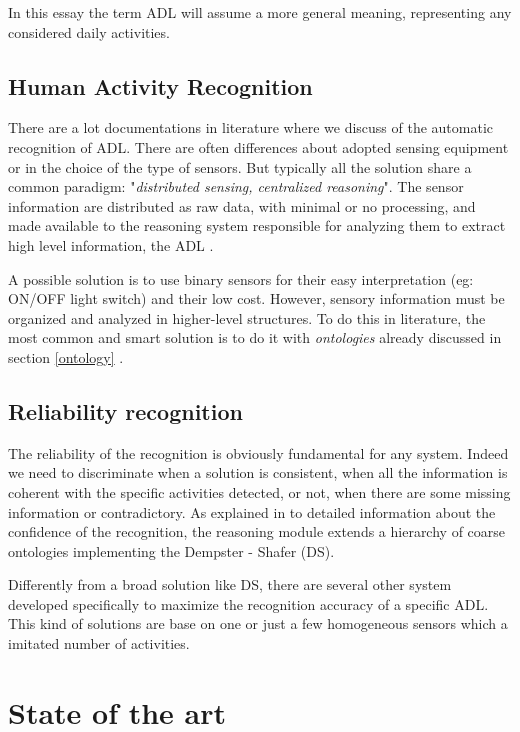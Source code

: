 \documentclass{thesisreport}
\begin{document}
In this essay the term ADL will assume a more general meaning, representing any  considered daily activities. 

\section{Human Activity Recognition}
There are a lot documentations in literature where we discuss of the automatic recognition of ADL. There are often differences about adopted sensing equipment or in the choice of the type of sensors. But typically all the solution share a common paradigm: "\textit{distributed sensing, centralized reasoning}". The sensor information are distributed as raw data, with minimal or no processing, and made available to the reasoning system responsible for analyzing them to extract high level information, the ADL \cite{buoncompagni2017towards}.   

A possible solution is to use binary sensors for their easy interpretation (eg: ON/OFF light switch) and their low cost. However, sensory information must be organized and analyzed in higher-level structures. To do this in literature, the most common and smart solution is to do it with \textit{ontologies}  already discussed in section \ref{ontology} \cite{buoncompagni2017towards}.

\section{Reliability recognition}
The reliability of the recognition is obviously fundamental for any system. Indeed we need to discriminate when a solution is consistent, when all the information is coherent with the specific activities detected, or not, when there are some missing information or contradictory.
As explained in \cite{sentz2002combination} to detailed information about the confidence of the recognition, the reasoning module extends a hierarchy of coarse ontologies implementing the Dempster - Shafer (DS). 

Differently from a broad solution like DS, there are several other system developed specifically to maximize the recognition accuracy of a specific ADL. This kind of solutions are base on one or just a few homogeneous sensors which a imitated number of activities.  

 \chapter{State of the art}
 
\end{document}
